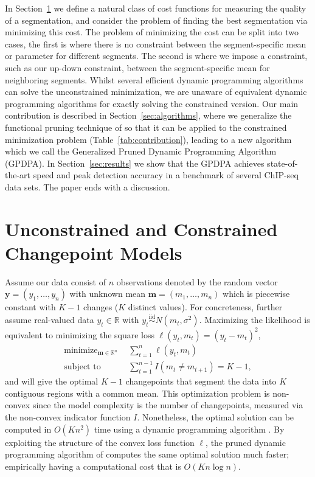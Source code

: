 \documentclass[twoside,11pt]{article}
\DeclareMathOperator*{\minimize}{minimize}
\newcommand{\RR}{\mathbb R}
\begin{document}
In Section~\ref{sec:models} we define a natural class of cost functions for 
measuring the quality of a segmentation, and consider the problem of finding the best segmentation
via minimizing this cost. The problem of minimizing the cost can be split into two cases, the first
is where there is no constraint between the segment-specific mean or parameter for different segments. The
second is where we impose a constraint, such as our up-down constraint, between the segment-specific
mean for neighboring segments. Whilst several efficient dynamic programming algorithms
can solve the unconstrained minimization, we are unaware of equivalent dynamic programming
algorithms for exactly solving the constrained version.  Our main contribution is described in 
Section~\ref{sec:algorithms}, where we generalize the functional pruning
technique of \citet{pruned-dp} so that it can be applied to the constrained minimization problem (Table~\ref{tab:contribution}), leading to a new algorithm which we call the Generalized
Pruned Dynamic Programming Algorithm (GPDPA). In Section~\ref{sec:results} 
we show that the GPDPA achieves state-of-the-art speed and peak detection accuracy in a benchmark of several ChIP-seq data sets. The paper ends with a discussion.

\section{Unconstrained and Constrained Changepoint Models}
\label{sec:models}

Assume our data consist of $n$ observations denoted by the random
vector $\mathbf y = (y_1, \dots, y_n)$ with unknown mean
$\mathbf m = (m_1,\dots, m_n)$ which is piecewise constant with $K-1$
changes ($K$ distinct values). For concreteness, further assume
real-valued data $y_t\in\RR$ with
$y_t\stackrel{\text{iid}}{\sim}N(m_t,\sigma^2)$. Maximizing the
likelihood is equivalent to minimizing the square loss
$\ell(y_t,m_t)=(y_t-m_t)^2$,
\begin{align}
  \label{eq:optimal_segment_neighborhood}
  \minimize_{\mathbf m\in\RR^n} &\ \ 
  \sum_{t=1}^n \ell(y_t, m_t)\\
  \text{subject to} &\ \  \sum_{t=1}^{n-1} I(m_t \neq m_{t+1}) = K-1,
  \nonumber
\end{align}
and will give the optimal $K-1$ changepoints that segment the data into $K$
contiguous regions with a common mean.  This optimization problem is non-convex since the model complexity is
the number of changepoints, measured via the non-convex indicator
function $I$. Nonetheless, the optimal solution can be computed in
$O(K n^2)$ time using a dynamic programming algorithm
\citep{segment-neighborhood}. By exploiting the structure of the
convex loss function $\ell$, the pruned dynamic programming algorithm
of \citet{pruned-dp} computes the same optimal solution much faster; empirically
having a computational cost that is
$O(K n \log n)$.
\end{document}
